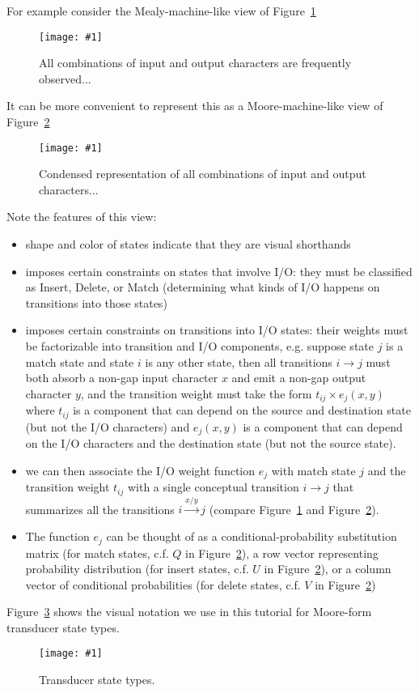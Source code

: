 \documentclass{article}
\newcommand{\figref}[1]{Figure~\ref{Figures.#1}}
\newcommand{\figlabel}[1]{\label{Figures.#1}}
\newcommand{\easyfig}[4]{
\begin{figure}
\texttt{[image: \#1]}
\caption{ \figlabel{#3} #4}
\end{figure}}
\newcommand{\widepngfig}[2]{\easyfig{#1.png}{width=\textwidth}{#1}{#2}}
\newcommand{\widepdffig}[2]{\easyfig{#1-fig.pdf}{width=\textwidth}{#1}{#2}}
\begin{document}
For example consider the Mealy-machine-like view of \figref{fanned-emission}
\widepngfig{fanned-emission}{All combinations of input and output characters are frequently observed...}

It can be more convenient to represent this as a Moore-machine-like view of \figref{condensed-emission}
\widepngfig{condensed-emission}{Condensed representation of all combinations of input and output characters...}

Note the features of this view:
\begin{itemize}
\item shape and color of states indicate that they are visual shorthands
\item imposes certain constraints on states that involve I/O:
 they must be classified as Insert, Delete, or Match
 (determining what kinds of I/O happens on transitions into those states)
\item imposes certain constraints on transitions into I/O states:
 their weights must be factorizable into transition and I/O components,
 e.g. suppose state $j$ is a match state and state $i$ is any other state,
 then all transitions $i \to j$ must both absorb a non-gap input character $x$
 and emit a non-gap output character $y$,
 and the transition weight must take the form $t_{ij} \times e_j(x,y)$
 where $t_{ij}$ is a component that can depend on the source and destination state
  (but not the I/O characters)
 and $e_j(x,y)$ is a component that can depend on the I/O characters and the destination state
  (but not the source state).
\item we can then associate the I/O weight function $e_j$ with match state $j$
 and the transition weight $t_{ij}$ with a single conceptual transition $i \to j$
 that summarizes all the transitions $i \stackrel{x/y}{\to} j$
 (compare \figref{fanned-emission} and \figref{condensed-emission}).
\item The function $e_j$ can be thought of as a conditional-probability substitution matrix
 (for match states, c.f. $Q$ in \figref{condensed-emission}),
a row vector representing probability distribution
 (for insert states, c.f. $U$ in \figref{condensed-emission}),
or a column vector of conditional probabilities
 (for delete states, c.f. $V$ in \figref{condensed-emission})
\end{itemize}

\figref{legend} shows the visual notation we use in this tutorial for Moore-form transducer state types.
\widepdffig{legend}{Transducer state types.}
\end{document}

